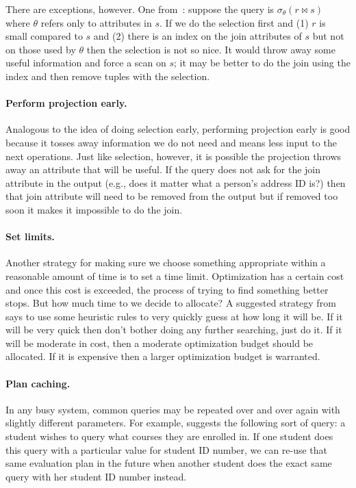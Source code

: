 There are exceptions, however. One from~\cite{dsc}: suppose the query is $\sigma_{\theta}( r \bowtie s )$ where $\theta$ refers only to attributes in $s$. If we do the selection first and (1) $r$ is small compared to $s$ and (2) there is an index on the join attributes of $s$ but not on those used by $\theta$ then the selection is not so nice. It would throw away some useful information and force a scan on $s$; it may be better to do the join using the index and then remove tuples with the selection.

\paragraph{Perform projection early.} Analogous to the idea of doing selection early, performing projection early is good because it tosses away information we do not need and means less input to the next operations. Just like selection, however, it is possible the projection throws away an attribute that will be useful. If the query does not ask for the join attribute in the output (e.g., does it matter what a person's address ID is?) then that join attribute will need to be removed from the output but if removed too soon it makes it impossible to do the join.

\paragraph{Set limits.} Another strategy for making sure we choose something appropriate within a reasonable amount of time is to set a time limit. Optimization has a certain cost and once this cost is exceeded, the process of trying to find something better stops. But how much time to we decide to allocate? A suggested strategy from~\cite{dsc} says to use some heuristic rules to very quickly guess at how long it will be. If it will be very quick then don't bother doing any further searching, just do it. If it will be moderate in cost, then a moderate optimization budget should be allocated. If it is expensive then a larger optimization budget is warranted.

\paragraph{Plan caching.} In any busy system, common queries may be repeated over and over again with slightly different parameters. For example, \cite{dsc} suggests the following sort of query: a student wishes to query what courses they are enrolled in. If one student does this query with a particular value for student ID number, we can re-use that same evaluation plan in the future when another student does the exact same query with her student ID number instead. 

